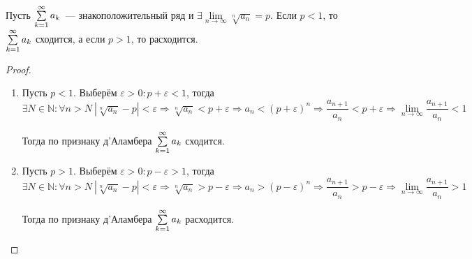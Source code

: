 \begin{theorem}
Пусть $\series a_k$~--- знакоположительный ряд и $\exists \lim\limits_{n \to \infty} \sqrt[n]{a_n} = p$.
Если $p < 1$, то $\series a_k$ сходится, а если $p > 1$, то расходится.
\end{theorem}
\begin{proof}
\begin{enumerate}
	\item Пусть $p < 1$.
	Выберём $\varepsilon > 0 \colon p + \varepsilon < 1$, тогда
	\begin{equation*}
	\exists N \in \mathbb N \colon \forall n > N \ \left| \sqrt[n]{a_n} - p \right| < \varepsilon \Rightarrow
	\sqrt[n]{a_n} < p + \varepsilon \Rightarrow
	a_n < (p + \varepsilon)^n \Rightarrow
	\frac{a_{n+1}}{a_n} < p + \varepsilon \Rightarrow
	\lim_{n \to \infty} \frac{a_{n+1}}{a_n} < 1
	\end{equation*}
	
	Тогда по признаку д'Аламбера $\series a_k$ сходится.
	
	\item Пусть $p > 1$.
	Выберём $\varepsilon > 0 \colon p - \varepsilon > 1$, тогда
	\begin{equation*}
	\exists N \in \mathbb N \colon \forall n > N \ \left| \sqrt[n]{a_n} - p \right| < \varepsilon \Rightarrow
	\sqrt[n]{a_n} > p - \varepsilon \Rightarrow
	a_n > (p - \varepsilon)^n \Rightarrow
	\frac{a_{n+1}}{a_n} > p - \varepsilon \Rightarrow
	\lim_{n \to \infty} \frac{a_{n+1}}{a_n} > 1
	\end{equation*}
	
	Тогда по признаку д'Аламбера $\series a_k$ расходится.
\end{enumerate}
\end{proof}